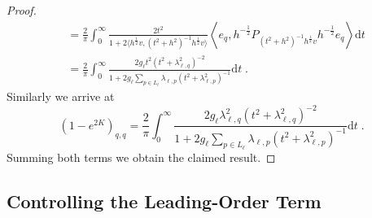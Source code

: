 \documentclass[12pt,a4paper]{article}
\numberwithin{equation}{section}
\newcommand{\1}{\mathbb{I}}
\newcommand{\Z}{\mathbb{Z}}
\newcommand{\half}{\frac{1}{2}}
\newcommand{\eva}[1]{\left\langle #1 \right\rangle}
\theoremstyle{plain}
\theoremstyle{definition}
\theoremstyle{remark}
\theoremstyle{plain}
\theoremstyle{definition}
\theoremstyle{remark}
\begin{document}
\begin{proof}
\begin{align}
	&= \frac{2}{\pi} \int_0^\infty \frac{2t^2}{1+ 2 \big\langle h^{\half} v ,(t^2+h^2)^{-1} h^\half v \big\rangle } \eva{e_q,h^{-\half} P_{(t^2+h^2)^{-1}h^{\half} v}h^{-\half} e_q}\mathrm{d}t\nonumber\\
	&= \frac{2}{\pi} \int_0^\infty \frac{2g_\ell t^2 (t^2+\lambda^2_{\ell,q})^{-2}}{1+ 2g_\ell\sum_{p \in L_\ell}\lambda_{\ell,p}(t^2+\lambda^2_{\ell,p})^{-1} } \mathrm{d}t \;. \label{eq:e-2k_integral}
\end{align}
Similarly we arrive at
\begin{equation} \label{eq:e2kfin}
	(1-e^{2K})_{q,q}
	= \frac{2}{\pi} \int_0^\infty \frac{2g_\ell \lambda_{\ell,q}^2 (t^2+\lambda^2_{\ell,q})^{-2}}{1+ 2g_\ell\sum_{p \in L_{\ell}}\lambda_{\ell,p}(t^2+\lambda^2_{\ell,p})^{-1} } \mathrm{d}t \;.
\end{equation}
Summing both terms we obtain the claimed result.
\end{proof}




\subsection{Controlling the Leading-Order Term}
\label{subsec:control_nqb}
\end{document}
